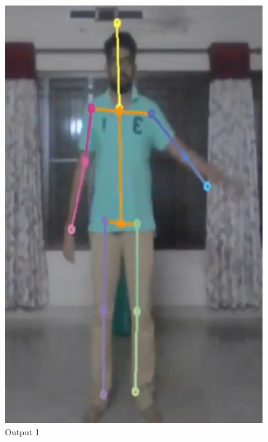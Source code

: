 \documentclass{fisatprojectfinal}
\begin{document}
\begin{figure}[h!]
	\begin{center}
	\includegraphics[scale=0.7]{op-1}
	\caption{Output 1}
\end{center}
\end{figure}
\end{document}
